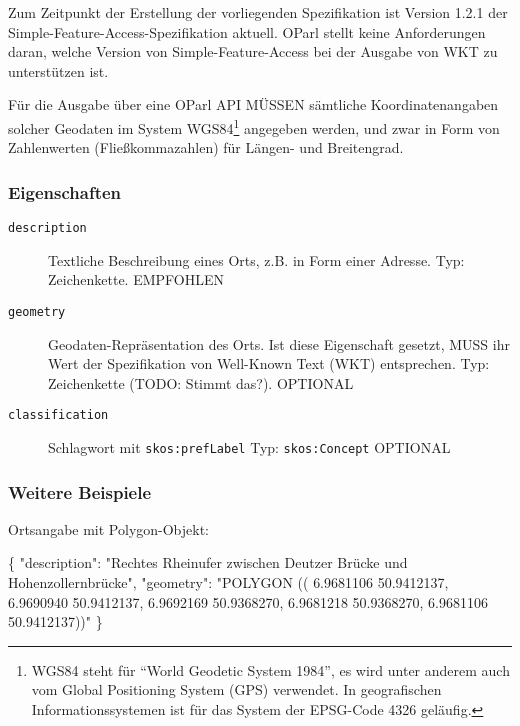 \documentclass[,a4paper]{article}
\newenvironment{Shaded}{}{}
\newcommand{\DataTypeTok}[1]{\textcolor[rgb]{0.56,0.13,0.00}{{#1}}}
\newcommand{\StringTok}[1]{\textcolor[rgb]{0.25,0.44,0.63}{{#1}}}
\newcommand{\NormalTok}[1]{{#1}}
\begin{document}
Zum Zeitpunkt der Erstellung der vorliegenden Spezifikation ist Version
1.2.1 der Simple-Feature-Access-Spezifikation aktuell. OParl stellt
keine Anforderungen daran, welche Version von Simple-Feature-Access bei
der Ausgabe von WKT zu unterstützen ist.

Für die Ausgabe über eine OParl API MÜSSEN sämtliche Koordinatenangaben
solcher Geodaten im System WGS84\footnote{WGS84 steht für ``World
  Geodetic System 1984'', es wird unter anderem auch vom Global
  Positioning System (GPS) verwendet. In geografischen
  Informationssystemen ist für das System der EPSG-Code 4326 geläufig.}
angegeben werden, und zwar in Form von Zahlenwerten (Fließkommazahlen)
für Längen- und Breitengrad.

\subsubsection{Eigenschaften}\label{eigenschaften-9}

\begin{description}
\item[\texttt{description}]
Textliche Beschreibung eines Orts, z.B. in Form einer Adresse. Typ:
Zeichenkette. EMPFOHLEN
\item[\texttt{geometry}]
Geodaten-Repräsentation des Orts. Ist diese Eigenschaft gesetzt, MUSS
ihr Wert der Spezifikation von Well-Known Text (WKT) entsprechen. Typ:
Zeichenkette (TODO: Stimmt das?). OPTIONAL
\item[\texttt{classification}]
Schlagwort mit \texttt{skos:prefLabel} Typ: \texttt{skos:Concept}
OPTIONAL
\end{description}

\subsubsection{Weitere Beispiele}\label{weitere-beispiele}

Ortsangabe mit Polygon-Objekt:

\begin{Shaded}
\begin{Highlighting}[]
\NormalTok{\{}
    \DataTypeTok{"description"}\NormalTok{: }\StringTok{"Rechtes Rheinufer zwischen Deutzer}
\StringTok{        Brücke und Hohenzollernbrücke"}\NormalTok{,}
    \DataTypeTok{"geometry"}\NormalTok{: }\StringTok{"POLYGON ((}
\StringTok{                6.9681106 50.9412137,}
\StringTok{                6.9690940 50.9412137,}
\StringTok{                6.9692169 50.9368270,}
\StringTok{                6.9681218 50.9368270,}
\StringTok{                6.9681106 50.9412137))"}
\NormalTok{\}}
\end{Highlighting}
\end{Shaded}
\end{document}

